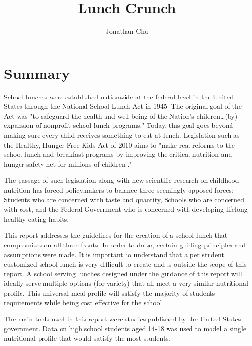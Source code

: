 \documentclass[letterpaper,oneside,12pt]{report}
\begin{document}
\pagestyle{empty} 

\title{Lunch Crunch}
\author{Jonathan Chu}
\maketitle

\tableofcontents 
\cleardoublepage 

\pagestyle{plain} 
\chapter{Summary}\label{Summary}
School lunches were established nationwide at the federal level in the United States through the National School Lunch Act in 1945. The original goal of the Act was "to safeguard the health and well-being of the Nation's children\ldots (by) expansion of nonprofit school lunch programs.\cite{NSLA}" Today, this goal goes beyond making sure every child receives something to eat at lunch. Legislation such as the Healthy, Hunger-Free Kids Act of 2010 aims to "make real reforms to the school lunch and breakfast programs by improving the critical nutrition and hunger safety net for millions of children \cite{USDAHHKA}."

The passage of such legislation along with new scientific research on childhood nutrition has forced policymakers to balance three seemingly opposed forces: Students who are concerned with taste and quantity, Schools who are concerned with cost, and the Federal Government who is concerned with developing lifelong healthy eating habits. 

This report addresses the guidelines for the creation of a school lunch that compromises on all three fronts. In order to do so, certain guiding principles and assumptions were made. It is important to understand that a per student customized school lunch is very difficult to create and is outside the scope of this report. A school serving lunches designed under the guidance of this report will ideally serve multiple options (for variety) that all meet a very similar nutritional profile. This universal meal profile will satisfy the majority of students requirements while being cost effective for the school. 

The main tools used in this report were studies published by the United States government. Data on high school students aged 14-18 was used to model a single nutritional profile that would satisfy the most students.  
\end{document}
